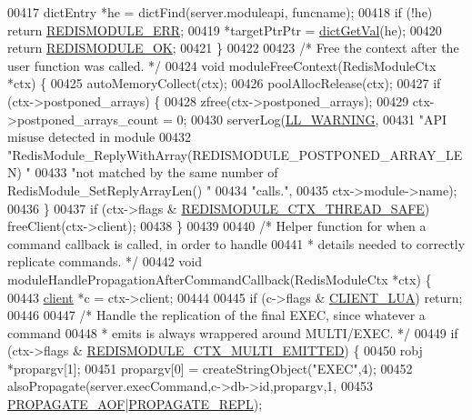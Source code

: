 \begin{DoxyCode}
00417     dictEntry *he = dictFind(server.moduleapi, funcname);
00418     \textcolor{keywordflow}{if} (!he) \textcolor{keywordflow}{return} \hyperlink{redismodule_8h_a3df6f5bd5247289e66f44437a7cddd49}{REDISMODULE\_ERR};
00419     *targetPtrPtr = \hyperlink{dict_8h_ae8d2cc391873b2bea2b87c4f80f43120}{dictGetVal}(he);
00420     \textcolor{keywordflow}{return} \hyperlink{redismodule_8h_a1bc5bfd69abcd378ff52c640adc5418d}{REDISMODULE\_OK};
00421 \}
00422 
00423 \textcolor{comment}{/* Free the context after the user function was called. */}
00424 \textcolor{keywordtype}{void} moduleFreeContext(RedisModuleCtx *ctx) \{
00425     autoMemoryCollect(ctx);
00426     poolAllocRelease(ctx);
00427     \textcolor{keywordflow}{if} (ctx->postponed\_arrays) \{
00428         zfree(ctx->postponed\_arrays);
00429         ctx->postponed\_arrays\_count = 0;
00430         serverLog(\hyperlink{server_8h_a31229b9334bba7d6be2a72970967a14b}{LL\_WARNING},
00431             \textcolor{stringliteral}{"API misuse detected in module %
00432             \textcolor{stringliteral}{"RedisModule\_ReplyWithArray(REDISMODULE\_POSTPONED\_ARRAY\_LEN) "}
00433             \textcolor{stringliteral}{"not matched by the same number of RedisModule\_SetReplyArrayLen() "}
00434             \textcolor{stringliteral}{"calls."},
00435             ctx->module->name);
00436     \}
00437     \textcolor{keywordflow}{if} (ctx->flags & \hyperlink{module_8c_a884fbd2b3a1b008f1635afaeb87ca52a}{REDISMODULE\_CTX\_THREAD\_SAFE}) freeClient(ctx->client);
00438 \}
00439 
00440 \textcolor{comment}{/* Helper function for when a command callback is called, in order to handle}
00441 \textcolor{comment}{ * details needed to correctly replicate commands. */}
00442 \textcolor{keywordtype}{void} moduleHandlePropagationAfterCommandCallback(RedisModuleCtx *ctx) \{
00443     \hyperlink{structclient}{client} *c = ctx->client;
00444 
00445     \textcolor{keywordflow}{if} (c->flags & \hyperlink{server_8h_af9d0b0f45ef2c1fd29ac714a300de706}{CLIENT\_LUA}) \textcolor{keywordflow}{return};
00446 
00447     \textcolor{comment}{/* Handle the replication of the final EXEC, since whatever a command}
00448 \textcolor{comment}{     * emits is always wrappered around MULTI/EXEC. */}
00449     \textcolor{keywordflow}{if} (ctx->flags & \hyperlink{module_8c_a4b2299e0b7b9fda08895270574120015}{REDISMODULE\_CTX\_MULTI\_EMITTED}) \{
00450         robj *propargv[1];
00451         propargv[0] = createStringObject(\textcolor{stringliteral}{"EXEC"},4);
00452         alsoPropagate(server.execCommand,c->db->id,propargv,1,
00453             \hyperlink{server_8h_a542fb79924ca427c866fd63632f60777}{PROPAGATE\_AOF}|\hyperlink{server_8h_a59c6e025b4ed85642a0472fc3e73e298}{PROPAGATE\_REPL});
}
\end{DoxyCode}
